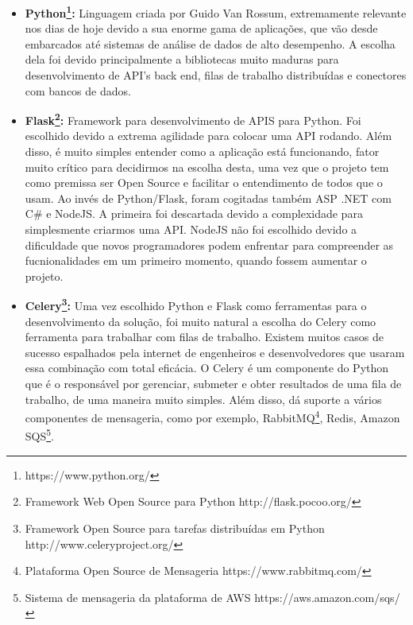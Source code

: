 \documentclass[11pt,twoside]{article}
\begin{document}
\begin{itemize}
  \item \textbf{Python\footnote{https://www.python.org/}:} Linguagem criada por Guido Van Rossum, extremamente relevante nos dias de hoje devido a sua enorme gama de aplicações, que vão desde embarcados até sistemas de análise de dados de alto 
  desempenho. A escolha dela foi devido principalmente a bibliotecas muito maduras para desenvolvimento de API's back end, filas de trabalho distribuídas e conectores com bancos de dados.

  \item \textbf{Flask\footnote{Framework Web Open Source para Python http://flask.pocoo.org/}:} Framework para desenvolvimento de APIS para Python. Foi escolhido devido a extrema agilidade para colocar uma API rodando. Além disso, é muito simples entender como a aplicação está funcionando,
  fator muito crítico para decidirmos na escolha desta, uma vez que o projeto tem como premissa ser Open Source e facilitar o entendimento de todos que o usam. Ao invés de Python/Flask, foram cogitadas também ASP .NET
  com C\# e NodeJS. A primeira foi descartada devido a complexidade para simplesmente criarmos uma API. NodeJS não foi escolhido devido a dificuldade que novos programadores podem enfrentar para compreender as
  fucnionalidades em um primeiro momento, quando fossem aumentar o projeto.

  \item \textbf{Celery\footnote{Framework Open Source para tarefas distribuídas em Python http://www.celeryproject.org/}:} Uma vez escolhido Python e Flask como ferramentas para o desenvolvimento da solução, foi muito natural a escolha do Celery como ferramenta para trabalhar com filas de trabalho. Existem muitos
  casos de sucesso espalhados pela internet de engenheiros e desenvolvedores que usaram essa combinação com total eficácia. O Celery é um componente do Python que é o responsável por gerenciar, submeter e obter
  resultados de uma fila de trabalho, de uma maneira muito simples. Além disso, dá suporte a vários componentes de mensageria, como por exemplo, RabbitMQ\footnote{Plataforma Open Source de Mensageria https://www.rabbitmq.com/}, 
  Redis, Amazon SQS\footnote{Sistema de mensageria da plataforma de AWS https://aws.amazon.com/sqs/}.


\end{itemize}
\end{document}
